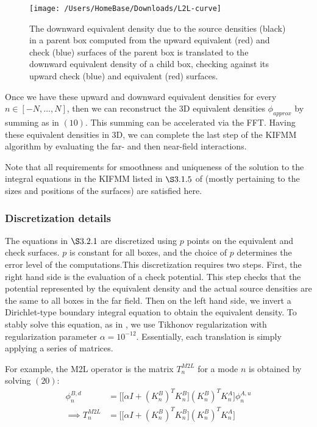 \documentclass[12pt,letterpaper]{article}
\begin{document}
\begin{figure}[!ht]
\begin{center}
\texttt{[image: /Users/HomeBase/Downloads/L2L-curve]}
\end{center}
\caption{The downward equivalent density due to the source densities (black) in a parent box computed from the upward equivalent (red) and check (blue) surfaces of the parent box is translated to the downward equivalent density of a child box, checking against its upward check (blue) and equivalent (red) surfaces.}
\end{figure}

Once we have these upward and downward equivalent densities for every $n\in[-N,\dots,N]$, then we can reconstruct the 3D equivalent densities $\phi_{approx}$ by summing as in $(10)$. This summing can be accelerated via the FFT. Having these equivalent densities in 3D, we can complete the last step of the KIFMM algorithm by evaluating the far- and then near-field interactions.

Note that all requirements for smoothness and uniqueness of the solution to the integral equations in the KIFMM listed in $\S3.1.5$ of \cite{YBZ} (mostly pertaining to the sizes and positions of the surfaces) are satisfied here.

\subsubsection{Discretization details}
The equations in $\S3.2.1$ are discretized using $p$ points on the equivalent and check surfaces. $p$ is constant for all boxes, and the choice of $p$ determines the error level of the computations.This discretization requires two steps. First, the right hand side is the evaluation of a check potential. This step checks that the potential represented by the equivalent density and the actual source densities are the same to all boxes in the far field. Then on the left hand side, we invert a Dirichlet-type boundary integral equation to obtain the equivalent density. To stably solve this equation, as in \cite{YBZ}, we use Tikhonov regularization with regularization parameter $\alpha=10^{-12}$. Essentially, each translation is simply applying a series of matrices.

For example, the M2L operator is the matrix $T^{M2L}_n$ for a mode $n$ is obtained by solving $(20)$:
\begin{align}
\phi^{B,d}_n&=\bigg[\big[\alpha I +(K_n^B)^TK_n^B\big](K_n^B)^TK_n^A\bigg]\phi^{A,u}_n\\
\implies T^{M2L}_n &= \bigg[\big[\alpha I +(K_n^B)^TK_n^B\big](K_n^B)^TK_n^A\bigg]
\end{align}
\end{document}
